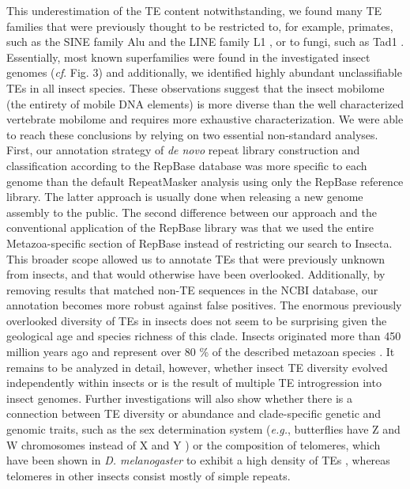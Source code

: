 This underestimation of the TE content notwithstanding, we found many TE
families that were previously thought to be restricted to, for example,
primates, such as the SINE family Alu \citep{Kriegs2007} and the LINE
family L1 \citep{Liu2003}, or to fungi, such as Tad1
\citep{Cambareri1994}. Essentially, most known superfamilies were found
in the investigated insect genomes (\emph{cf}. Fig. 3) and additionally,
we identified highly abundant unclassifiable TEs in all insect species.
These observations suggest that the insect mobilome (the entirety of
mobile DNA elements) is more diverse than the well characterized
vertebrate mobilome \citep{Chalopin2015} and requires more exhaustive
characterization. We were able to reach these conclusions by relying on
two essential non-standard analyses. First, our annotation strategy of
\emph{de novo} repeat library construction and classification according
to the RepBase database was more specific to each genome than the
default RepeatMasker analysis using only the RepBase reference library.
The latter approach is usually done when releasing a new genome assembly
to the public. The second difference between our approach and the
conventional application of the RepBase library was that we used the
entire Metazoa-specific section of RepBase instead of restricting our
search to Insecta. This broader scope allowed us to annotate TEs that
were previously unknown from insects, and that would otherwise have been
overlooked. Additionally, by removing results that matched non-TE
sequences in the NCBI database, our annotation becomes more robust
against false positives. The enormous previously overlooked diversity of
TEs in insects does not seem to be surprising given the geological age
and species richness of this clade. Insects originated more than 450
million years ago \citep{Misof2014} and represent over 80 \% of the
described metazoan species \citep{Grimaldi2005}. It remains to be
analyzed in detail, however, whether insect TE diversity evolved
independently within insects or is the result of multiple TE
introgression into insect genomes. Further investigations will also show
whether there is a connection between TE diversity or abundance and
clade-specific genetic and genomic traits, such as the sex determination
system (\emph{e.g.}, butterflies have Z and W chromosomes instead of X
and Y \citep{Traut1997}) or the composition of telomeres, which have
been shown in \emph{D. melanogaster} to exhibit a high density of TEs
\citep{Levis1993}, whereas telomeres in other insects consist mostly of
simple repeats.

